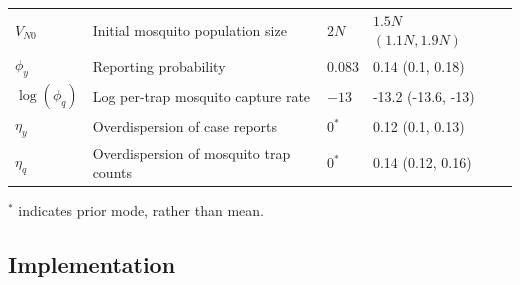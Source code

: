 \documentclass[10pt,letterpaper]{article}
\begin{document}
\begin{table}[!ht]
\begin{adjustwidth}{-2.25in}{0in}
\begin{center}
\begin{tabular}{lp{6cm}lll}
$V_{N0}$ & Initial mosquito population size & $2N$ & $1.5N$ $(1.1N, 1.9N)$ &\\
$\phi_y$ & Reporting probability & 0.083 & 0.14  (0.1, 0.18) &\cite{Silva2016}\\
$\log(\phi_q)$ & Log per-trap mosquito capture rate & $-13$  & -13.2 (-13.6, -13)  &\\
$\eta_y$ & Overdispersion of case reports & $0^*$ & 0.12 (0.1, 0.13) &\\
$\eta_q$ & Overdispersion of mosquito trap counts & $0^*$ & 0.14 (0.12, 0.16)&\\
\end{tabular}
\end{center}
\end{adjustwidth}
$^*$ indicates prior mode, rather than mean.
\end{table}

\subsection*{Implementation}
\end{document}
